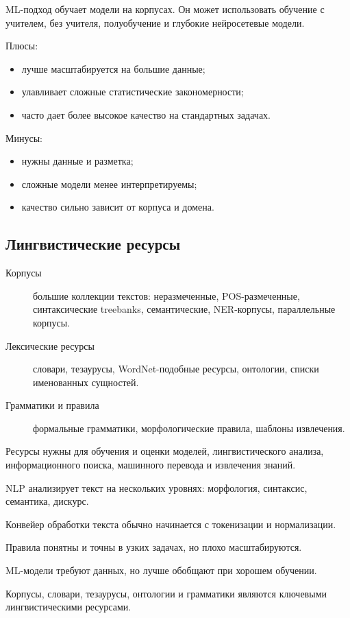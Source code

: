 ML-подход обучает модели на корпусах. Он может использовать обучение с учителем, без учителя, полуобучение и глубокие нейросетевые модели.

Плюсы:
\begin{itemize}
    \item лучше масштабируется на большие данные;
    \item улавливает сложные статистические закономерности;
    \item часто дает более высокое качество на стандартных задачах.
\end{itemize}

Минусы:
\begin{itemize}
    \item нужны данные и разметка;
    \item сложные модели менее интерпретируемы;
    \item качество сильно зависит от корпуса и домена.
\end{itemize}

\subsection*{Лингвистические ресурсы}

\begin{description}
    \item[Корпусы] большие коллекции текстов: неразмеченные, POS-размеченные, синтаксические treebanks, семантические, NER-корпусы, параллельные корпусы.
    \item[Лексические ресурсы] словари, тезаурусы, WordNet-подобные ресурсы, онтологии, списки именованных сущностей.
    \item[Грамматики и правила] формальные грамматики, морфологические правила, шаблоны извлечения.
\end{description}

Ресурсы нужны для обучения и оценки моделей, лингвистического анализа, информационного поиска, машинного перевода и извлечения знаний.

\begin{important}
    \item NLP анализирует текст на нескольких уровнях: морфология, синтаксис, семантика, дискурс.
    \item Конвейер обработки текста обычно начинается с токенизации и нормализации.
    \item Правила понятны и точны в узких задачах, но плохо масштабируются.
    \item ML-модели требуют данных, но лучше обобщают при хорошем обучении.
    \item Корпусы, словари, тезаурусы, онтологии и грамматики являются ключевыми лингвистическими ресурсами.
\end{important}
